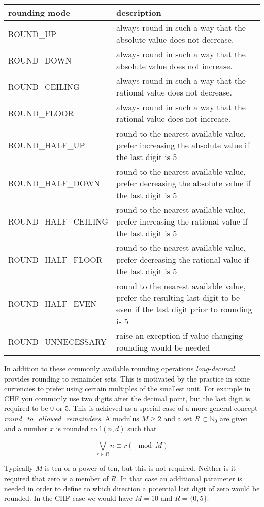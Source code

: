 \documentclass[10pt,a4paper]{article}
\def\ld{\mathrm l}
\begin{document}
\begin{tabular}{|l|l|}
\hline
{\bfseries rounding mode}&{\bfseries description}\\
\hline
  ROUND\_UP           & always round in such a way that the absolute value does not decrease.\\
\hline
  ROUND\_DOWN         & always round in such a way that the absolute value does not increase.\\
\hline
  ROUND\_CEILING      & always round in such a way that the rational value does not decrease.\\
\hline
  ROUND\_FLOOR        & always round in such a way that the rational value does not increase.\\
\hline
  ROUND\_HALF\_UP      & round to the nearest available value, prefer increasing the absolute value if the last digit is 5\\
\hline
  ROUND\_HALF\_DOWN    & round to the nearest available value, prefer decreasing the absolute value if the last digit is 5\\
\hline
  ROUND\_HALF\_CEILING & round to the nearest available value, prefer increasing the rational value if the last digit is 5\\
\hline
  ROUND\_HALF\_FLOOR   & round to the nearest available value, prefer decreasing the rational value if the last digit is 5\\
\hline
  ROUND\_HALF\_EVEN    & round to the nearest available value, prefer the resulting last digit to be even if the last digit prior to rounding is 5\\
\hline
  ROUND\_UNNECESSARY  & raise an exception if value changing rounding would be needed\\
\hline
\end{tabular}

In addition to these commonly available rounding operations {\slshape long-decimal\/} provides rounding to remainder sets.  This is motivated by the practice in some
currencies to prefer using certain multiples of the smallest unit.  For example in CHF you commonly use two digits after the decimal point, but the last digit is
required to be 0 or 5.  This is achieved as a special case of a more general concept {\slshape round\_to\_allowed\_remainders\/}.  A modulus $M \ge 2$ and a set
$R\subset\mathbb{N}_0$ are given and a number $x$ is rounded to $\ld(n, d)$ such that

$$\bigvee_{r\in R} n \equiv r (\mod M)$$

Typically $M$ is ten or a power of ten, but this is not required.  Neither is it required that zero is a member of $R$.  In that case an additional parameter is needed
in order to define to which direction a potential last digit of zero would be rounded.  In the CHF case we would have $M=10$ and $R=\{0, 5\}$.
\end{document}

